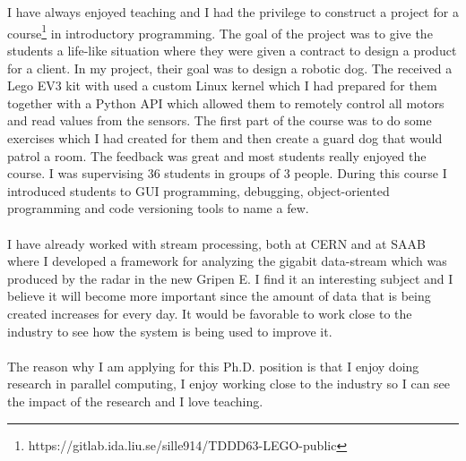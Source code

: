 \documentclass[left=2.5cm,top=2cm,right=2.5cm,bottom=2.5cm]{cv-style}
\begin{document}
\\
\\
I have always enjoyed teaching and I had the privilege to construct a project for a course\footnote{https://gitlab.ida.liu.se/sille914/TDDD63-LEGO-public} in introductory programming. The goal of the project was to give the students a life-like situation where they were given a contract to design a product for a client. In my project, their goal was to design a robotic dog. The received a Lego EV3 kit with used a custom Linux kernel which I had prepared for them together with a Python API which allowed them to remotely control all motors and read values from the sensors. The first part of the course was to do some exercises which I had created for them and then create a guard dog that would patrol a room. The feedback was great and most students really enjoyed the course. I was supervising 36 students in groups of 3 people. During this course I introduced students to GUI programming, debugging, object-oriented programming and code versioning tools to name a few. 
\\
\\
I have already worked with stream processing, both at CERN and at SAAB where I developed a framework for analyzing the gigabit data-stream which was produced by the radar in the new Gripen E. I find it an interesting subject and I believe it will become more important since the amount of data that is being created increases for every day. It would be favorable to work close to the industry to see how the system is being used to improve it. 
\\
\\
The reason why I am applying for this Ph.D. position is that I enjoy doing research in parallel computing, I enjoy working close to the industry so I can see the impact of the research and I love teaching. 
\end{document}
